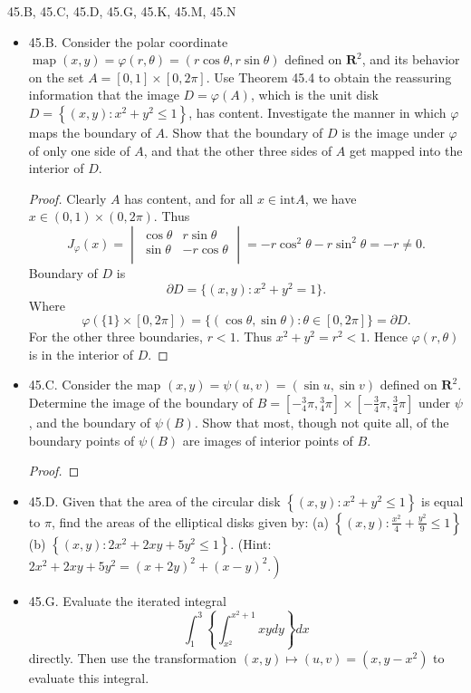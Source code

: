 
45.B, 45.C, 45.D, 45.G, 45.K, 45.M, 45.N

\begin{itemize}
	\item 45.B. Consider the polar coordinate $\operatorname{map}(x, y)=\varphi(r, \theta)=(r \cos \theta, r \sin \theta)$ defined on $\boldsymbol{R}^2$, and its behavior on the set $A=[0,1] \times[0,2 \pi]$. Use Theorem 45.4 to obtain the reassuring information that the image $D=\varphi(A)$, which is the unit disk $D=\left\{(x, y): x^2+y^2 \leq 1\right\}$, has content. Investigate the manner in which $\varphi$ maps the boundary of $A$. Show that the boundary of $D$ is the image under $\varphi$ of only one side of $A$, and that the other three sides of $A$ get mapped into the interior of $D$.
\begin{proof}
	Clearly $A$ has content, and for all $x \in \text{int} A$, we have $x \in (0,1) \times (0, 2 \pi)$. Thus
	\[
		J_\varphi(x) = 
		\begin{vmatrix}
			\cos \theta & r \sin \theta \\
			\sin \theta & - r \cos \theta \\
		\end{vmatrix}
		= - r \cos^2 \theta - r \sin^2 \theta = - r \neq 0
	.\] 
	Boundary of $D$ is
	 \[
		\partial D = \{(x,y): x^2 + y^2 = 1\}
	.\] 
	Where
	\[
		\varphi\left( \{1\} \times [0,2 \pi] \right) = \{(\cos \theta, \sin \theta): \theta \in [0,2 \pi]\} = \partial D
	.\] 
	For the other three boundaries, $r < 1$. Thus $x^2 + y^2 = r^2 < 1$. Hence $\varphi(r, \theta)$ is in the interior of $D$.
\end{proof}


	\item 45.C. Consider the map $(x, y)=\psi(u, v)=(\sin u, \sin v)$ defined on $\boldsymbol{R}^2$. Determine the image of the boundary of $B=\left[-{ }_4^3 \pi,{ }_4^3 \pi\right] \times\left[-\frac{3}{4} \pi, \frac{3}{4} \pi\right]$ under $\psi$, and the boundary of $\psi(B)$. Show that most, though not quite all, of the boundary points of $\psi(B)$ are images of interior points of $B$.
\begin{proof}
\end{proof}


	\item 45.D. Given that the area of the circular disk $\left\{(x, y): x^2+y^2 \leq 1\right\}$ is equal to $\pi$, find the areas of the elliptical disks given by:
(a) $\left\{(x, y): \frac{x^2}{4}+\frac{y^2}{9} \leq 1\right\}$
(b) $\left\{(x, y): 2 x^2+2 x y+5 y^2 \leq 1\right\}$.
(Hint: $\left.2 x^2+2 x y+5 y^2=(x+2 y)^2+(x-y)^2.\right)$
\item 45.G. Evaluate the iterated integral
\[
\int_1^3\left\{\int_{x^2}^{x^2+1} x y d y\right\} d x
\]
directly. Then use the transformation $(x, y) \mapsto(u, v)=\left(x, y-x^2\right)$ to evaluate this integral.


\end{itemize}
